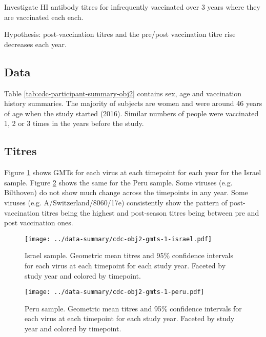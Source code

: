 \documentclass[12pt]{article}
\begin{document}
Investigate HI antibody titres for infrequently vaccinated over 3 years where
they are vaccinated each each.

Hypothesis: post-vaccination titres and the pre/post vaccination titre rise
decreases each year.

\subsection{Data}

Table \ref{tab:cdc-participant-summary-obj2} contains sex, age and
vaccination history summaries.
The majority of subjects are
women and were around 46 years of age when the study started (2016).
Similar numbers of people were vaccinated 1, 2 or 3 times in the years before
the study.



\subsection{Titres}

Figure \ref{fig:cdc-obj2-gmts-1-israel} shows GMTs for each virus at each timepoint for each year for the Israel sample. Figure \ref{fig:cdc-obj2-gmts-1-peru} shows the same for the Peru sample.
Some viruses (e.g. Bilthoven) do not show much change across the timepoints in
any year. Some viruses (e.g. A/Switzerland/8060/17e) consistently show the pattern of post-vaccination titres being the highest and post-season titres being between pre and post vaccination ones.

\begin{figure}
	\texttt{[image: ../data-summary/cdc-obj2-gmts-1-israel.pdf]}
	\caption{Israel sample. Geometric mean titres and 95\% confidence intervals for each virus at each timepoint for each study year. Faceted by study year and colored by timepoint.}
	\label{fig:cdc-obj2-gmts-1-israel}
\end{figure}

\begin{figure}
	\texttt{[image: ../data-summary/cdc-obj2-gmts-1-peru.pdf]}
	\caption{Peru sample. Geometric mean titres and 95\% confidence intervals for each virus at each timepoint for each study year. Faceted by study year and colored by timepoint.}
	\label{fig:cdc-obj2-gmts-1-peru}
\end{figure}
\end{document}
